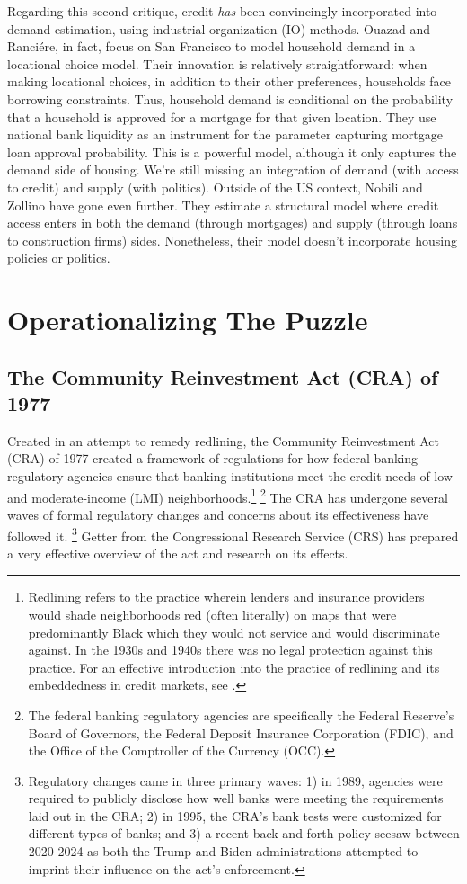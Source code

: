 \documentclass{article}[11pt]
\begin{document}
Regarding this second critique, credit \textit{has} been convincingly incorporated into demand estimation, using industrial organization (IO) methods. Ouazad and Ranciére, in fact, focus on San Francisco to model household demand in a locational choice model. \citep{ouazad2015structural} Their innovation is relatively straightforward: when making locational choices, in addition to their other preferences, households face borrowing constraints. Thus, household demand is conditional on the probability that a household is approved for a mortgage for that given location. They use national bank liquidity as an instrument for the parameter capturing mortgage loan approval probability. This is a powerful model, although it only captures the demand side of housing. We're still missing an integration of demand (with access to credit) and supply (with politics). Outside of the US context, Nobili and Zollino have gone even further. \citep{nobili2017structural} They estimate a structural model where credit access enters in both the demand (through mortgages) and supply (through loans to construction firms) sides. Nonetheless, their model doesn't incorporate housing policies or politics.

\section{Operationalizing The Puzzle}

	\subsection{The Community Reinvestment Act (CRA) of 1977}
Created in an attempt to remedy redlining, the Community Reinvestment Act (CRA) of 1977 created a framework of regulations for how federal banking regulatory agencies ensure that banking institutions meet the credit needs of low- and moderate-income (LMI) neighborhoods.\footnote{Redlining refers to the practice wherein lenders and insurance providers would shade neighborhoods red (often literally) on maps that were predominantly Black which they would not service and would discriminate against. In the 1930s and 1940s there was no legal protection against this practice. For an effective introduction into the practice of redlining and its embeddedness in credit markets, see \cite{hillier2003redlining}.} \footnote{The federal banking regulatory agencies are specifically the Federal Reserve's Board of Governors, the Federal Deposit Insurance Corporation (FDIC), and the Office of the Comptroller of the Currency (OCC).} The CRA has undergone several waves of formal regulatory changes and concerns about its effectiveness have followed it. \footnote{Regulatory changes came in three  primary waves: 1) in 1989, agencies were required to publicly disclose how well banks were meeting the requirements laid out in the CRA; 2) in 1995, the CRA's bank tests were customized for different types of banks; and 3) a recent back-and-forth policy seesaw between 2020-2024 as both the Trump and Biden administrations attempted to imprint their influence on the act's enforcement.} Getter from the Congressional Research Service (CRS) has prepared a very effective overview of the act and research on its effects. \citep{getter2015effectiveness} 
\end{document}

